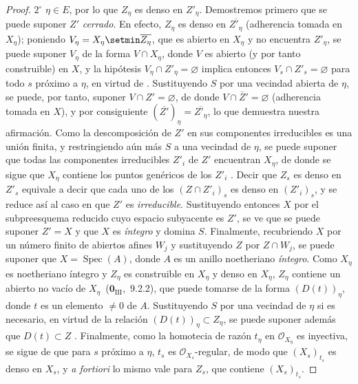 \begin{proof}
  \label{IV.9.5.3.case2}$2^\circ$ $\eta\in E$, por lo que $Z_\eta$ es denso en $Z'_\eta$.
  Demostremos primero que se puede suponer $Z'$ \emph{cerrado}.
  En efecto, $Z_\eta$ es denso en $\overline{Z'_\eta}$ (adherencia tomada en $X_\eta$); poniendo $V_\eta=X_\eta\setmin\overline{Z_\eta}$, que es abierto en $X_\eta$ y no encuentra $Z'_\eta$, se puede suponer $V_\eta$ de la forma $V\cap X_\eta$, donde $V$ es abierto (y por tanto construible) en $X$, y la hipótesis $V_\eta\cap Z'_\eta=\varnothing$ implica entonces $V_s\cap Z'_s=\varnothing$ para todo $s$ próximo a $\eta$, en virtud de .
  Sustituyendo $S$ por una vecindad abierta de $\eta$, se puede, por tanto, suponer $V\cap Z'=\varnothing$, de donde $V\cap\overline Z'=\varnothing$ (adherencia tomada en $X$), y por consiguiente $(\overline{Z'})_\eta=\overline{Z'_\eta}$, lo que demuestra nuestra afirmación.
  Como la descomposición de $Z'$ en sus componentes irreducibles es una unión finita, y restringiendo aún más $S$ a una vecindad de $\eta$, se puede suponer que todas las componentes irreducibles $Z'_i$ de $Z'$ encuentran $X_\eta$, de donde se sigue que $X_\eta$ contiene los puntos genéricos de los $Z'_i$ .
  Decir que $Z_s$ es denso en $Z'_s$ equivale a decir que cada uno de los $(Z\cap Z'_i)_s$ es denso en $(Z'_i)_s$, y se reduce así al caso en que $Z'$ es \emph{irreducible}.
  Sustituyendo entonces $X$ por el subpreesquema reducido cuyo espacio subyacente es $Z'$, se ve que se puede suponer $Z'=X$ y que $X$ es \emph{íntegro} y domina $S$.
  Finalmente, recubriendo $X$ por un número finito de abiertos afines $W_j$ y sustituyendo $Z$ por $Z\cap W_j$, se puede suponer que $X=\operatorname{Spec}(A)$, donde $A$ es un anillo noetheriano \emph{íntegro}.
  Como $X_\eta$ es noetheriano íntegro y $Z_\eta$ es construible en $X_\eta$ y denso en $X_\eta$, $Z_\eta$ contiene un abierto no vacío de $X_\eta$~($\mathbf{0}_{\mathrm{III}}$,~9.2.2), que puede tomarse de la forma $(D(t))_\eta$, donde $t$ es un elemento $\neq0$ de $A$.
  Sustituyendo $S$ por una vecindad de $\eta$ si es necesario, en virtud de la relación $(D(t))_\eta\subset Z_\eta$, se puede suponer además que $D(t)\subset Z$ .
  Finalmente, como la homotecia de razón $t_\eta$ en $\mathcal O_{X_\eta}$ es inyectiva, se sigue de  que para $s$ próximo a $\eta$, $t_s$ es $\mathcal O_{X_s}$-regular, de modo que $(X_s)_{t_s}$ es denso en $X_s$, y \emph{a fortiori} lo mismo vale para $Z_s$, que contiene $(X_s)_{t_s}$.

\end{proof}

